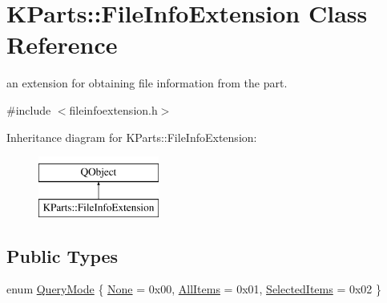 \hypertarget{classKParts_1_1FileInfoExtension}{\section{K\+Parts\+:\+:File\+Info\+Extension Class Reference}
\label{classKParts_1_1FileInfoExtension}
}


an extension for obtaining file information from the part.  




{\ttfamily \#include $<$fileinfoextension.\+h$>$}

Inheritance diagram for K\+Parts\+:\+:File\+Info\+Extension\+:\begin{figure}[H]
\begin{center}
\leavevmode
\includegraphics[height=2.000000cm]{classKParts_1_1FileInfoExtension}
\end{center}
\end{figure}
\subsection*{Public Types}
\begin{DoxyCompactItemize}
\item 
enum \hyperlink{classKParts_1_1FileInfoExtension_a9bc830a53b0005013082984a2bbd5639}{Query\+Mode} \{ \hyperlink{classKParts_1_1FileInfoExtension_a9bc830a53b0005013082984a2bbd5639af7f7b524610ed47f67081fee1a37a604}{None} = 0x00, 
\hyperlink{classKParts_1_1FileInfoExtension_a9bc830a53b0005013082984a2bbd5639a553b2481b4b7b99d8f839eed303177d8}{All\+Items} = 0x01, 
\hyperlink{classKParts_1_1FileInfoExtension_a9bc830a53b0005013082984a2bbd5639aaa07fd2649d0deb94a819b29cddbe32e}{Selected\+Items} = 0x02
 \}
\end{DoxyCompactItemize}
